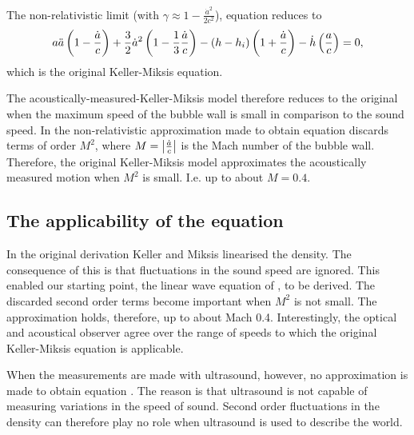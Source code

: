  The  non-relativistic limit (with $\gamma \approx 1 - \frac{{\dot a}^2}{2c^2}$), equation  reduces to
\begin{align}
  a \ddot a\left( 1 - \frac{\dot a}{c} \right)+ \frac{3}{2} {\dot a}^2\left( 1- \frac{1}{3}\frac{\dot a }{c} \right)
    - \left( h - h_i \right)\left( 1 + \frac{\dot a}{c} \right)
  -  \dot h \left( \frac{a}{c} \right)
= 0, \label{eqn:KM}
\end{align}
which is the original Keller-Miksis equation\cite{Hoff2001}.

The acoustically-measured-Keller-Miksis model therefore reduces to the original when the maximum speed of the bubble wall is small in comparison to the sound speed.
In the non-relativistic approximation made to obtain equation  discards terms of order $M^2$, 
where  $M = \left| \frac{\dot a}{c} \right|$ is the Mach number of the bubble wall.
Therefore, the original Keller-Miksis model approximates the acoustically measured motion when $M^2$ is small.
I.e. %
up to about $M=0.4$.


\subsection{The applicability of the equation}
In the original derivation Keller and Miksis linearised the density. 
The consequence of this is that fluctuations in the sound speed are ignored.
This enabled our starting point, the linear wave equation of  , to be derived.
The discarded second order terms become important when $M^2$ is not small.
The approximation holds, therefore, up to about Mach 0.4.
Interestingly,  the optical and acoustical observer
agree over the range of speeds to which the original Keller-Miksis equation is applicable.

When the measurements are made with ultrasound,
however, 
no approximation is made to obtain equation .
The reason is that  ultrasound is not capable of  measuring variations in the speed of sound.
Second order fluctuations in the density  can therefore play no role when ultrasound is used to describe the world.

